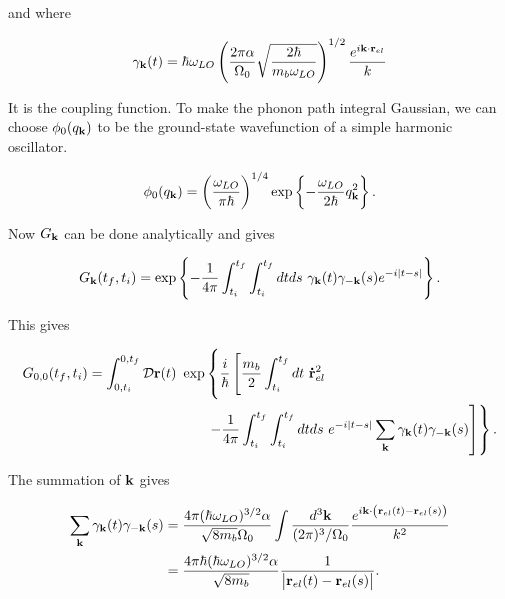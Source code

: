 and where

\begin{equation}
    \gamma_{\vb{k}}(t) = \hbar \omega_{LO} \left(\frac{2 \pi \alpha}{\Omega_0} \sqrt{\frac{2 \hbar}{m_b \omega_{LO}}}\right)^{1/2} \frac{e^{i \vb{k} \cdot \vb{r}_{el}}}{k}
\end{equation}

It is the coupling function. To make the phonon path integral Gaussian, we can choose $\phi_0(q_{\vb{k}})$ to be the ground-state wavefunction of a simple harmonic oscillator.

\begin{equation}
    \phi_0(q_{\vb{k}}) = \left(\frac{\omega_{LO}}{\pi\hbar}\right)^{1/4} \exp \left\{-\frac{\omega_{LO}}{2\hbar} q_{\vb{k}}^2\right\}.
\end{equation}

Now $G_{\vb{k}}$ can be done analytically and gives

\begin{equation}
    G_{\vb{k}}(t_f, t_i) = \exp \left\{ -\frac{1}{4\pi} \int_{t_i}^{t_f} \int_{t_i}^{t_f} dt ds\ \gamma_{\vb{k}}(t) \gamma_{\vb{-k}}(s) e^{-i\abs{t-s}} \right\}.
\end{equation}

This gives

\begin{equation}
\begin{aligned}
    G_{0,0}(t_f, t_i) = \int^{0, t_f}_{0, t_i} \mathcal{D}\vb{r}(t)\ \exp&\left\{ \frac{i}{\hbar} \left[  \frac{m_b}{2} \int^{t_f}_{t_i} dt\ \vb{\dot{r}}_{el}^2 \right.\right. \\
    &\left.\left.-\frac{1}{4\pi} \int_{t_i}^{t_f} \int_{t_i}^{t_f} dt ds\ e^{-i\abs{t-s}} \sum_{\vb{k}} \gamma_{\vb{k}}(t) \gamma_{\vb{-k}}(s) \right] \right\}.
\end{aligned}
\end{equation}

The summation of $\vb{k}$ gives

\begin{equation}
\begin{aligned}
    \sum_{\vb{k}} \gamma_{\vb{k}}(t) \gamma_{\vb{-k}}(s) &= \frac{4\pi(\hbar \omega_{LO})^{3/2} \alpha}{\sqrt{8 m_b} \Omega_0} \int \frac{d^3\vb{k}}{(2\pi)^3/\Omega_0} \frac{e^{i\vb{k}\cdot \left(\vb{r}_{el}(t) - \vb{r}_{el}(s) \right)}}{k^2} \\
    &= \frac{4\pi\hbar(\hbar \omega_{LO})^{3/2} \alpha}{\sqrt{8 m_b}} \frac{1}{\abs{\vb{r}_{el}(t) - \vb{r}_{el}(s)}}.
\end{aligned}
\end{equation}

